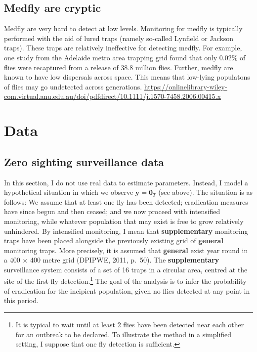 \documentclass[
]{book}
\begin{document}
\hypertarget{medfly-are-cryptic}{%
\subsection{Medfly are cryptic}\label{medfly-are-cryptic}}

Medfly are very hard to detect at low levels. Monitoring for medfly is typically performed with the aid of lured traps (namely so-called Lynfield or Jackson traps). These traps are relatively ineffective for detecting medfly. For example, one study from the Adelaide metro area trapping grid found that only 0.02\% of flies were recaptured from a release of 38.8 million flies. Further, medfly are known to have low dispersals across space. This means that low-lying populatons of flies may go undetected across generations. \url{https://onlinelibrary-wiley-com.virtual.anu.edu.au/doi/pdfdirect/10.1111/j.1570-7458.2006.00415.x}

\hypertarget{data}{%
\section{Data}\label{data}}

\hypertarget{zero-sighting-surveillance-data}{%
\subsection{Zero sighting surveillance data}\label{zero-sighting-surveillance-data}}

In this section, I do not use real data to estimate parameters. Instead, I model a hypothetical situation in which we observe \(\mathbf y = \mathbf 0_T\) (see above). The situation is as follows: We assume that at least one fly has been detected; eradication measures have since begun and then ceased; and we now proceed with intensified monitoring, while whatever population that may exist is free to grow relatively unhindered. By intensified monitoring, I mean that \textbf{supplementary} monitoring traps have been placed alongside the previously existing grid of \textbf{general} monitoring traps. More precisely, it is assumed that \textbf{general} exist year round in a 400 \(\times\) 400 metre grid (DPIPWE, 2011, p.~50). The \textbf{supplementary} surveillance system consists of a set of 16 traps in a circular area, centred at the site of the first fly detection.\footnote{It is typical to wait until at least 2 flies have been detected near each other for an outbreak to be declared. To illustrate the method in a simplified setting, I suppose that one fly detection is sufficient.} The goal of the analysis is to infer the probability of eradication for the incipient population, given no flies detected at any point in this period.
\end{document}
